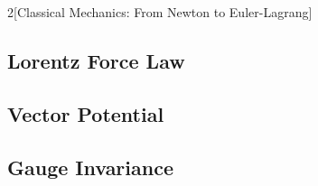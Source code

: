 \documentclass{article}
\begin{document}
\begin{multicols}{2}[Classical Mechanics: From Newton to Euler-Lagrang]
\subsection{Lorentz Force Law}
\subsection{Vector Potential}
\subsection{Gauge Invariance}



\end{multicols}
\end{document}
